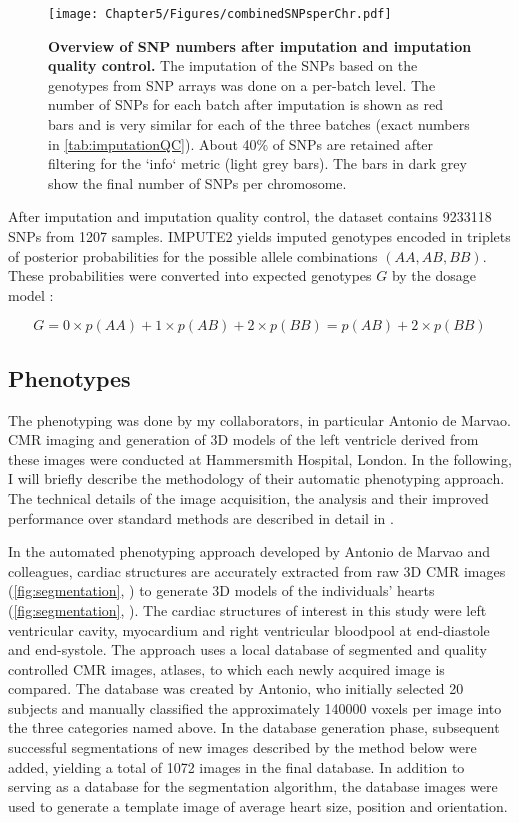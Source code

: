 \begin{figure}[hbtp]
	\centering
	\texttt{[image: Chapter5/Figures/combinedSNPsperChr.pdf]}
	\caption[\textbf{Overview of SNP numbers after imputation and imputation quality control. }]{\textbf{Overview of SNP numbers after imputation and imputation quality control. } The imputation of the SNPs based on the genotypes from SNP arrays was done on a per-batch level. The number of SNPs for each batch after imputation is shown as red bars and is very similar for each of the three batches (exact numbers in \cref{tab:imputationQC}). About \num{40}\% of SNPs are retained after filtering for the `info` metric (light grey bars). The bars in dark grey show the final number of SNPs per chromosome. }
 	\label{fig:imputeQC}
\end{figure}
%
After imputation and imputation quality control, the dataset contains \num{9233118} SNPs from \num{1207} samples. IMPUTE2 yields imputed genotypes encoded in triplets of posterior probabilities for the possible allele combinations \((AA, AB, BB)\). These probabilities were converted into expected genotypes \(G\) by the dosage model \citep{Howie2011}:

\begin{equation}
	G = 0 \times p(AA) + 1 \times p(AB) + 2 \times p(BB) = p(AB) + 2 \times p(BB)
\end{equation}


\subsection{Phenotypes}
\label{subsection:phentoypes}
The phenotyping was done by my collaborators, in particular Antonio de Marvao. CMR imaging and generation of 3D models of the left ventricle derived from these images were conducted at Hammersmith Hospital, London. In the following, I will briefly describe the methodology of their automatic phenotyping approach. The technical details of the image acquisition, the analysis and their improved performance over standard methods are described in detail in \citep{deMarvao2014}. 

In the automated phenotyping approach developed by Antonio de Marvao and colleagues, cardiac structures are accurately extracted from raw 3D CMR images (\cref{fig:segmentation}, ) to generate 3D models of the individuals' hearts  (\cref{fig:segmentation}, ). The cardiac structures of interest in this study were left ventricular cavity, myocardium and right ventricular bloodpool at end-diastole and end-systole. The approach uses a local database of segmented and quality controlled CMR images, atlases, to which each newly acquired image is compared. The database was created by Antonio, who initially selected \num{20} subjects and manually classified the approximately \num{140000} voxels per image into the three categories named above. In the database generation phase, subsequent successful segmentations of new images described by the method below were added, yielding a total of \num{1072} images in the final database. In addition to serving as a database for the segmentation algorithm, the database images were used to generate a template image of average heart size, position and orientation. 

